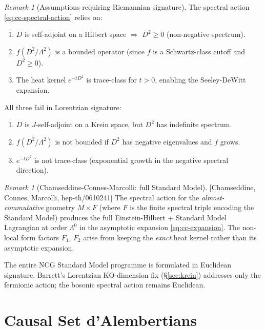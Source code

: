 \documentclass[12pt,a4paper]{article}
\theoremstyle{definition}
\theoremstyle{remark}
\newtheorem{remark}[proposition]{Remark}
\newcommand{\fromlit}[1]{\textcolor{blue!70!black}{\textsf{[#1]}}}
\begin{document}
\begin{remark}[Assumptions requiring Riemannian signature]
\label{rem:riem-assumptions}
The spectral action \eqref{eq:cc-spectral-action} relies on:
\begin{enumerate}[nosep,label=(\roman*)]
  \item $D$ is self-adjoint on a Hilbert space $\Rightarrow$
    $D^2 \geq 0$ (non-negative spectrum).
  \item $f(D^2/\Lambda^2)$ is a bounded operator (since $f$ is
    a Schwartz-class cutoff and $D^2 \geq 0$).
  \item The heat kernel $e^{-tD^2}$ is trace-class for $t > 0$,
    enabling the Seeley-DeWitt expansion.
\end{enumerate}
All three fail in Lorentzian signature:
\begin{enumerate}[nosep,label=(\roman*)]
  \item $D$ is $J$-self-adjoint on a Krein space, but $D^2$ has
    indefinite spectrum.
  \item $f(D^2/\Lambda^2)$ is not bounded if $D^2$ has negative
    eigenvalues and $f$ grows.
  \item $e^{-tD^2}$ is not trace-class (exponential growth in the
    negative spectral direction).
\end{enumerate}
\end{remark}

\begin{remark}[Chamseddine-Connes-Marcolli: full Standard Model]
\label{rem:ccm}
\fromlit{Chamseddine, Connes, Marcolli, hep-th/0610241}
The spectral action for the \emph{almost-commutative} geometry
$M \times F$ (where $F$ is the finite spectral triple encoding the
Standard Model) produces the full Einstein-Hilbert + Standard Model
Lagrangian at order $\Lambda^0$ in the asymptotic expansion
\eqref{eq:cc-expansion}.  The non-local form factors $F_1$, $F_2$
arise from keeping the \emph{exact} heat kernel rather than its
asymptotic expansion.

The entire NCG Standard Model programme is formulated in Euclidean
signature.  Barrett's Lorentzian KO-dimension fix (\S\ref{sec:krein})
addresses only the fermionic action; the bosonic spectral action
remains Euclidean.
\end{remark}


\section{Causal Set d'Alembertians}
\label{sec:causal-sets}
\end{document}
